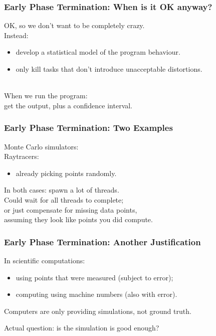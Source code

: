 \begin{frame}
  \frametitle{Early Phase Termination: When is it OK anyway?}


OK, so we don't want to be completely crazy.\\[1em]

Instead: 
\begin{itemize}
\item develop a statistical model of the program behaviour.
\item only kill tasks that don't introduce unacceptable distortions.
\end{itemize}

~\\[1em]

When we run the program: \\ \qquad get the output, plus a confidence interval.



\end{frame}

\begin{frame}
  \frametitle{Early Phase Termination: Two Examples}



Monte Carlo simulators: \\
Raytracers:
\begin{itemize}
\item already picking points randomly.
\end{itemize}

In both cases: spawn a lot of threads.\\[1em]
Could wait for all threads to complete;\\
or just compensate for missing data points,\\
assuming they look like points you did compute.


\end{frame}

\begin{frame}
  \frametitle{Early Phase Termination: Another Justification}



In scientific computations:
\begin{itemize}
\item using points that were measured (subject to error);
\item computing using machine numbers (also with error). 
\end{itemize}

Computers are only providing simulations, not ground truth.

Actual question: is the simulation is good enough?

\end{frame}

